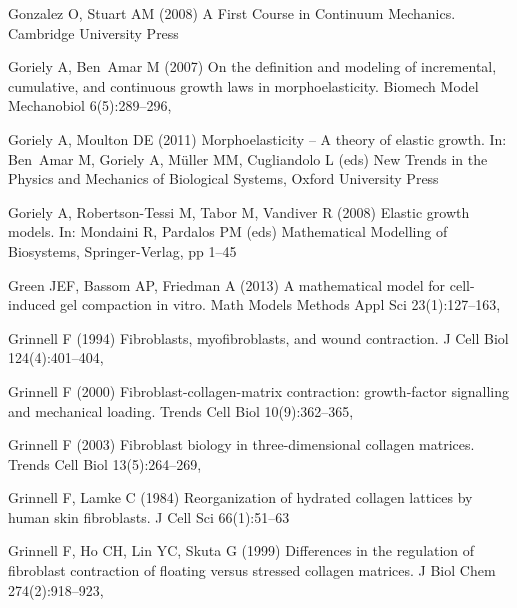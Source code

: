 \begin{thebibliography}{124}
Gonzalez O, Stuart AM (2008) A First Course in Continuum Mechanics. Cambridge
  University Press

Goriely A, Ben~Amar M (2007) On the definition and modeling of incremental,
  cumulative, and continuous growth laws in morphoelasticity. Biomech Model
  Mechanobiol 6(5):289--296, 

Goriely A, Moulton DE (2011) Morphoelasticity -- {A} theory of elastic growth.
  In: Ben~Amar M, Goriely A, M{\"u}ller MM, Cugliandolo L (eds) New Trends in
  the Physics and Mechanics of Biological Systems, Oxford University Press

Goriely A, Robertson-Tessi M, Tabor M, Vandiver R (2008) Elastic growth models.
  In: Mondaini R, Pardalos PM (eds) Mathematical Modelling of Biosystems,
  Springer-Verlag, pp 1--45

Green JEF, Bassom AP, Friedman A (2013) A mathematical model for cell-induced
  gel compaction in vitro. Math Models Methods Appl Sci 23(1):127--163,

Grinnell F (1994) Fibroblasts, myofibroblasts, and wound contraction. J Cell
  Biol 124(4):401--404, 

Grinnell F (2000) Fibroblast-collagen-matrix contraction: growth-factor
  signalling and mechanical loading. Trends Cell Biol 10(9):362--365,

Grinnell F (2003) Fibroblast biology in three-dimensional collagen matrices.
  Trends Cell Biol 13(5):264--269, 

Grinnell F, Lamke C (1984) Reorganization of hydrated collagen lattices by
  human skin fibroblasts. J Cell Sci 66(1):51--63

Grinnell F, Ho CH, Lin YC, Skuta G (1999) Differences in the regulation of
  fibroblast contraction of floating versus stressed collagen matrices. J Biol
  Chem 274(2):918--923, 


\end{thebibliography}
